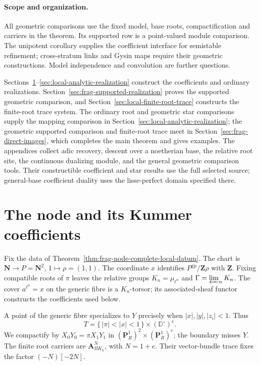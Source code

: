 \documentclass[11pt]{article}
\theoremstyle{definition}
\theoremstyle{remark}
\begin{document}
\paragraph{Scope and organization.}
All geometric comparisons use the fixed model, base roots,
compactification and carriers in the theorem.  Its supported row is
a point-valued module comparison.  The unipotent corollary supplies
the coefficient interface for semistable refinement; cross-stratum
links and Gysin maps require their geometric constructions.
Model independence and convolution are further questions.

Sections~\ref{sec:local-node-coefficients}--\ref{sec:local-analytic-realization}
construct the coefficients and ordinary realizations.
Section~\ref{sec:frag-supported-realization} proves the supported
geometric comparison, and Section~\ref{sec:local-finite-root-trace}
constructs the finite-root trace system.  The ordinary root and geometric star comparisons supply the mapping
comparison in Section~\ref{sec:local-analytic-realization}; the geometric
supported comparison and finite-root trace meet in
Section~\ref{sec:frag-direct-images}, which completes the main theorem
and gives examples.
The appendices collect adic recovery, descent over a noetherian
base, the relative root site, the continuous dualizing module, and
the general geometric comparison tools.  Their constructible
coefficient and star results use the full selected source; general-base
coefficient duality uses the lisse-perfect domain specified there.

\section{The node and its Kummer coefficients}
\label{sec:local-node-coefficients}

Fix the data of Theorem~\ref{thm:frag-node-complete-local-datum}.
The chart is $\mathbf N\to P=\mathbf N^2$, $1\mapsto\rho=(1,1)$.
The coordinate $x$ identifies $P^{\mathrm{gp}}/\mathbf Z\rho$ with
$\mathbf Z$.  Fixing compatible roots of $\pi$ leaves the relative
groups $K_n=\mu_{\ell^n}$ and $\Gamma=\varprojlim_nK_n$.
The cover $a^{\ell^n}=x$ on the generic fibre is a $K_n$-torsor;
its associated-sheaf functor constructs the coefficients used below.

A point of the generic fibre specializes to $Y$ precisely when
$|x|,|y|,|z_i|<1$.  Thus
\[
 T=\{\,|\pi|<|x|<1\,\}\times(\mathbb D^\circ)^e.
\]
We compactify by $X_0Y_0=\pi X_1Y_1$ in
$(\mathbf P^1_R)^2\times(\mathbf P^1_R)^e$; the boundary misses $Y$.
The finite root carriers are $\mathbf A^N_{BK_n}$, with $N=1+e$.
Their vector-bundle trace fixes the factor $(-N)[-2N]$.
\end{document}
